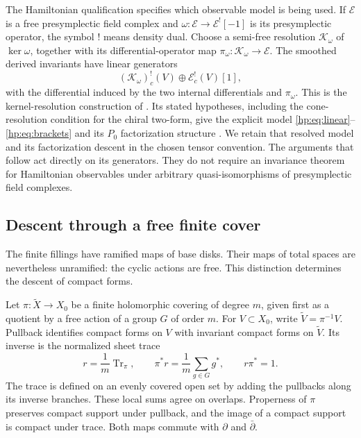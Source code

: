 The Hamiltonian qualification specifies which observable model is
being used. If $\mathcal E$ is a free presymplectic field complex and
$\omega:\mathcal E\to\mathcal E^![-1]$ is its presymplectic
operator, the symbol $!$ means density dual. Choose a semi-free
resolution $\mathcal K_\omega$ of $\ker\omega$, together with its
differential-operator map $\pi_\omega:\mathcal K_\omega\to\mathcal E$.
The smoothed derived invariants have linear generators
\begin{equation}\label{hp:eq:kernel-recipe}
 (\mathcal K_\omega)^!_c(V)\oplus\mathcal E^!_c(V)[1],
\end{equation}
with the differential induced by the two internal differentials and
$\pi_\omega$. This is the kernel-resolution construction of
\cite[\S2.4.1]{SaberiWilliamsConstraints}. Its stated hypotheses,
including the cone-resolution condition for the chiral two-form,
give the explicit model \eqref{hp:eq:linear}--\eqref{hp:eq:brackets}
and its $P_0$ factorization structure
\cite[\S4.6]{SaberiWilliamsConstraints}. We retain that resolved model
and its factorization descent in the chosen tensor convention.
The arguments that follow act directly on its generators. They do
not require an invariance theorem for Hamiltonian observables under
arbitrary quasi-isomorphisms of presymplectic field complexes.

\subsection{Descent through a free finite cover}
\label{hp:subsec:finite}

The finite fillings have ramified maps of base disks. Their maps of
total spaces are nevertheless unramified: the cyclic actions are
free. This distinction determines the descent of compact forms.

Let $\pi:\widetilde X\to X_0$ be a finite holomorphic covering of
degree $m$, given first as a quotient by a free action of a group
$G$ of order $m$. For $V\subset X_0$, write
$\widetilde V=\pi^{-1}V$. Pullback identifies compact forms on $V$
with invariant compact forms on $\widetilde V$. Its inverse is the
normalized sheet trace
\begin{equation}\label{hp:eq:trace}
 r=\frac1m\operatorname{Tr}_\pi,
 \qquad
 \pi^*r=\frac1m\sum_{g\in G}g^*,\qquad r\pi^*=1.
\end{equation}
The trace is defined on an evenly covered open set by adding the
pullbacks along its inverse branches. These local sums agree on
overlaps. Properness of $\pi$ preserves compact support under
pullback, and the image of a compact support is compact under trace.
Both maps commute with $\partial$ and $\bar\partial$.

